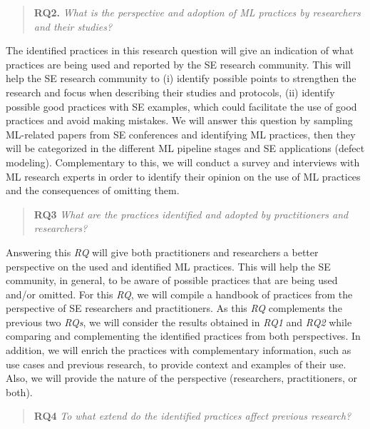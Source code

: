 \begin{quote}\textbf{RQ2.} \emph{What is the perspective  and adoption  of ML practices by researchers and their studies? } \end{quote} %

The identified practices in this research question will give an indication of what practices are being used and reported by the SE research community.  This will help the SE research community to (i) identify possible points to strengthen the research and focus when describing their studies and protocols, (ii) identify possible good practices with SE examples,  which could facilitate the use of good practices and avoid making mistakes. We will answer this question by sampling ML-related papers from SE conferences and identifying ML practices, then they will be categorized in the different ML pipeline stages and SE applications (\ie defect modeling).  Complementary to this, we will conduct a survey and interviews with ML research experts in order to identify their opinion on the use of ML practices and the consequences of omitting them. %


\begin{quote}\textbf{RQ3} \emph{What are the practices identified and adopted by practitioners and researchers? }\end{quote}

Answering this \textit{RQ}  will give both practitioners and researchers a better perspective on the used and identified ML practices. This will help the SE community,  in general,  to be aware of possible practices that are being used and/or omitted. For this \textit{RQ}, we will compile a handbook of practices from the  perspective of  SE researchers and practitioners.  As this \textit{RQ} complements the previous two \textit{RQs}, we will consider the results obtained in \textit{RQ1} and \textit{RQ2} while comparing and complementing the identified practices from both perspectives. In addition, we will enrich the practices with complementary information, such as use cases and previous research, to provide context and examples of their use. Also, we will provide the nature of the perspective (\ie researchers, practitioners, or both). 

\begin{quote}\textbf{RQ4} \emph{To what extend do the identified practices affect previous research?  }\end{quote}

